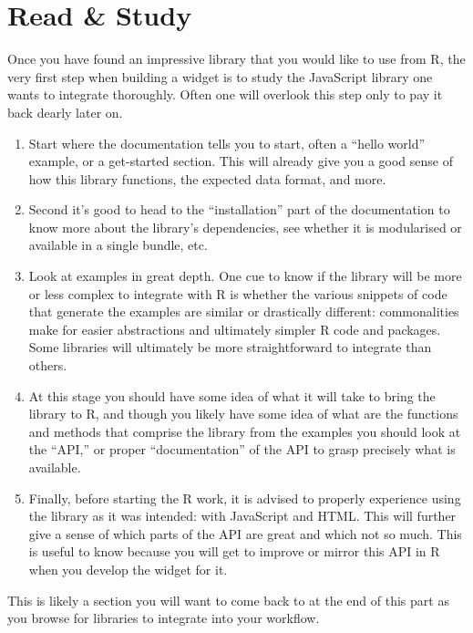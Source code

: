 \documentclass[
  10pt,
]{krantz}
\providecommand{\tightlist}{%
  \setlength{\itemsep}{0pt}\setlength{\parskip}{0pt}}
\begin{document}
\hypertarget{widgets-basics-study}{%
\section{Read \& Study}\label{widgets-basics-study}}

Once you have found an impressive library that you would like to use from R, the very first step when building a widget is to study the JavaScript library one wants to integrate thoroughly. Often one will overlook this step only to pay it back dearly later on.

\begin{enumerate}
\def\labelenumi{\arabic{enumi}.}
\tightlist
\item
  Start where the documentation tells you to start, often a ``hello world'' example, or a get-started section. This will already give you a good sense of how this library functions, the expected data format, and more.
\item
  Second it's good to head to the ``installation'' part of the documentation to know more about the library's dependencies, see whether it is modularised or available in a single bundle, etc.
\item
  Look at examples in great depth. One cue to know if the library will be more or less complex to integrate with R is whether the various snippets of code that generate the examples are similar or drastically different: commonalities make for easier abstractions and ultimately simpler R code and packages. Some libraries will ultimately be more straightforward to integrate than others.
\item
  At this stage you should have some idea of what it will take to bring the library to R, and though you likely have some idea of what are the functions and methods that comprise the library from the examples you should look at the ``API,'' or proper ``documentation'' of the API to grasp precisely what is available.
\item
  Finally, before starting the R work, it is advised to properly experience using the library as it was intended: with JavaScript and HTML. This will further give a sense of which parts of the API are great and which not so much. This is useful to know because you will get to improve or mirror this API in R when you develop the widget for it.
\end{enumerate}

This is likely a section you will want to come back to at the end of this part as you browse for libraries to integrate into your workflow.
\end{document}
